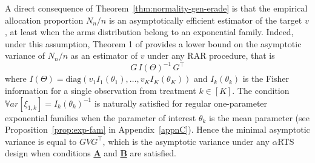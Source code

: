 \begin{remark} A direct consequence of Theorem~\ref{thm:normality-gen-erade} is that the empirical allocation proportion $N_n/n$ is an asymptotically efficient estimator of the target $v$, at least when the arms distribution belong to an exponential family. Indeed, under this assumption, Theorem 1 of \cite{hu2006asymptotically} provides a lower bound on the asymptotic variance of $N_n/n$ as an estimator of $v$ under any RAR procedure, that is
\[G\,I(\Theta)^{-1}\,G^{\top }\]
where  \(I(\Theta) = \mathrm{diag}\left(v_1 I_1(\theta_1), \dots, v_K I_K(\theta_K)\right)\) and \(I_k(\theta_k)\) is the Fisher information for a single observation from treatment \(k \in [K]\). The condition $\mathbb{V}ar\left[\xi_{1,k}\right] = I_k(\theta_k)^{-1}$ is naturally satisfied for regular one-parameter exponential families when the parameter of interest $\theta_k$ is the mean parameter (see Proposition~\ref{prop:exp-fam} in Appendix~\ref{appnC}). Hence the minimal asymptotic variance is equal to $GVG^{\top}$, which is the asymptotic variance under any $\alpha$RTS design when conditions \hyperlink{CA}{\textbf{A}} and \hyperlink{CB}{\textbf{B}} are satisfied.
\end{remark}

%
%
%
%
%


